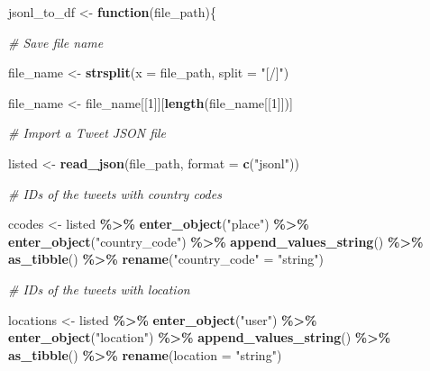 \documentclass[
]{book}
\newenvironment{Shaded}{\begin{snugshade}}{\end{snugshade}}
\newcommand{\CommentTok}[1]{\textcolor[rgb]{0.56,0.35,0.01}{\textit{#1}}}
\newcommand{\ControlFlowTok}[1]{\textcolor[rgb]{0.13,0.29,0.53}{\textbf{#1}}}
\newcommand{\DataTypeTok}[1]{\textcolor[rgb]{0.13,0.29,0.53}{#1}}
\newcommand{\DecValTok}[1]{\textcolor[rgb]{0.00,0.00,0.81}{#1}}
\newcommand{\KeywordTok}[1]{\textcolor[rgb]{0.13,0.29,0.53}{\textbf{#1}}}
\newcommand{\NormalTok}[1]{#1}
\newcommand{\OperatorTok}[1]{\textcolor[rgb]{0.81,0.36,0.00}{\textbf{#1}}}
\newcommand{\StringTok}[1]{\textcolor[rgb]{0.31,0.60,0.02}{#1}}
\begin{document}
\begin{Shaded}
\begin{Highlighting}[]
\NormalTok{jsonl\_to\_df \textless{}{-}}\StringTok{ }\ControlFlowTok{function}\NormalTok{(file\_path)\{}

\CommentTok{\# Save file name }

\NormalTok{file\_name \textless{}{-}}\StringTok{ }\KeywordTok{strsplit}\NormalTok{(}\DataTypeTok{x =}\NormalTok{ file\_path, }
                     \DataTypeTok{split =} \StringTok{"[/]"}\NormalTok{) }

\NormalTok{file\_name \textless{}{-}}\StringTok{ }\NormalTok{file\_name[[}\DecValTok{1}\NormalTok{]][}\KeywordTok{length}\NormalTok{(file\_name[[}\DecValTok{1}\NormalTok{]])]}

\CommentTok{\# Import a Tweet JSON file}

\NormalTok{listed \textless{}{-}}\StringTok{ }\KeywordTok{read\_json}\NormalTok{(file\_path, }\DataTypeTok{format =} \KeywordTok{c}\NormalTok{(}\StringTok{"jsonl"}\NormalTok{))}

\CommentTok{\# IDs of the tweets with country codes}

\NormalTok{ccodes \textless{}{-}}\StringTok{ }\NormalTok{listed }\OperatorTok{\%\textgreater{}\%}
\StringTok{  }\KeywordTok{enter\_object}\NormalTok{(}\StringTok{"place"}\NormalTok{) }\OperatorTok{\%\textgreater{}\%}
\StringTok{  }\KeywordTok{enter\_object}\NormalTok{(}\StringTok{"country\_code"}\NormalTok{) }\OperatorTok{\%\textgreater{}\%}
\StringTok{  }\KeywordTok{append\_values\_string}\NormalTok{() }\OperatorTok{\%\textgreater{}\%}
\StringTok{  }\KeywordTok{as\_tibble}\NormalTok{() }\OperatorTok{\%\textgreater{}\%}
\StringTok{  }\KeywordTok{rename}\NormalTok{(}\StringTok{"country\_code"}\NormalTok{ =}\StringTok{ "string"}\NormalTok{)}

\CommentTok{\# IDs of the tweets with location}

\NormalTok{locations \textless{}{-}}\StringTok{ }\NormalTok{listed }\OperatorTok{\%\textgreater{}\%}
\StringTok{  }\KeywordTok{enter\_object}\NormalTok{(}\StringTok{"user"}\NormalTok{) }\OperatorTok{\%\textgreater{}\%}
\StringTok{  }\KeywordTok{enter\_object}\NormalTok{(}\StringTok{"location"}\NormalTok{) }\OperatorTok{\%\textgreater{}\%}
\StringTok{  }\KeywordTok{append\_values\_string}\NormalTok{() }\OperatorTok{\%\textgreater{}\%}
\StringTok{  }\KeywordTok{as\_tibble}\NormalTok{() }\OperatorTok{\%\textgreater{}\%}
\StringTok{  }\KeywordTok{rename}\NormalTok{(}\DataTypeTok{location =} \StringTok{"string"}\NormalTok{)}


\end{Highlighting}
\end{Shaded}
\end{document}
